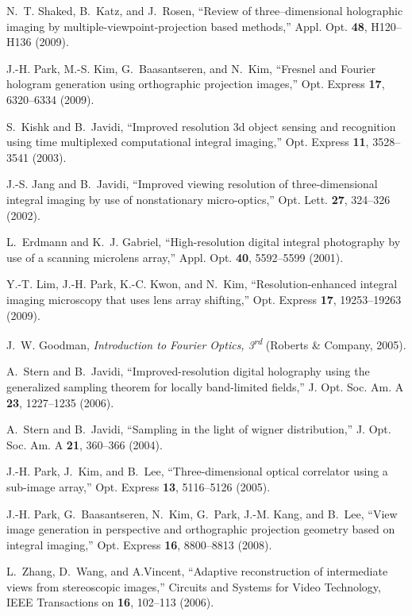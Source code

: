 \documentclass[10pt,letterpaper]{article}
\begin{document}
\begin{thebibliography}{10}
\newcommand{\enquote}[1]{``#1''}

N.~T. Shaked, B.~Katz, and J.~Rosen, \enquote{Review of three--dimensional
  holographic imaging by multiple-viewpoint-projection based methods,} Appl.
  Opt. \textbf{48}, H120--H136 (2009).

J.-H. Park, M.-S. Kim, G.~Baasantseren, and N.~Kim, \enquote{Fresnel and
  {F}ourier hologram generation using orthographic projection images,} Opt.
  Express \textbf{17}, 6320--6334 (2009).

S.~Kishk and B.~Javidi, \enquote{Improved resolution 3d object sensing and
  recognition using time multiplexed computational integral imaging,} Opt.
  Express \textbf{11}, 3528--3541 (2003).

J.-S. Jang and B.~Javidi, \enquote{Improved viewing resolution of
  three-dimensional integral imaging by use of nonstationary micro-optics,}
  Opt. Lett. \textbf{27}, 324--326 (2002).

L.~Erdmann and K.~J. Gabriel, \enquote{High-resolution digital integral
  photography by use of a scanning microlens array,} Appl. Opt. \textbf{40},
  5592--5599 (2001).

Y.-T. Lim, J.-H. Park, K.-C. Kwon, and N.~Kim, \enquote{Resolution-enhanced
  integral imaging microscopy that uses lens array shifting,} Opt. Express
  \textbf{17}, 19253--19263 (2009).

J.~W. Goodman, \emph{Introduction to Fourier Optics, 3\textsuperscript{rd}}
  (Roberts \& Company, 2005).

A.~Stern and B.~Javidi, \enquote{Improved-resolution digital holography using
  the generalized sampling theorem for locally band-limited fields,} J. Opt.
  Soc. Am. A \textbf{23}, 1227--1235 (2006).

A.~Stern and B.~Javidi, \enquote{Sampling in the light of wigner distribution,}
  J. Opt. Soc. Am. A \textbf{21}, 360--366 (2004).

J.-H. Park, J.~Kim, and B.~Lee, \enquote{Three-dimensional optical correlator
  using a sub-image array,} Opt. Express \textbf{13}, 5116--5126 (2005).

J.-H. Park, G.~Baasantseren, N.~Kim, G.~Park, J.-M. Kang, and B.~Lee,
  \enquote{View image generation in perspective and orthographic projection
  geometry based on integral imaging,} Opt. Express \textbf{16}, 8800--8813
  (2008).

L.~Zhang, D.~Wang, and A.Vincent, \enquote{Adaptive reconstruction of
  intermediate views from stereoscopic images,} Circuits and Systems for Video
  Technology, IEEE Transactions on \textbf{16}, 102--113 (2006).

\end{thebibliography}
\end{document}
